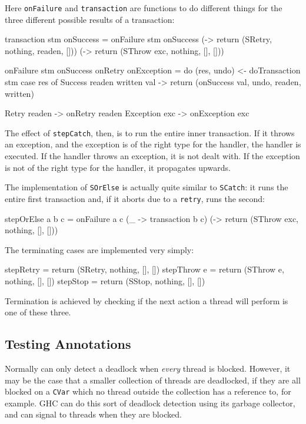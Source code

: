 Here \verb|onFailure| and \verb|transaction| are functions to do
different things for the three different possible results of a
transaction:

\begin{haskellcode}
transaction stm onSuccess = onFailure stm onSuccess
  (\readen -> return (SRetry, nothing, readen, []))
  (\exc    -> return (SThrow exc, nothing, [], []))

onFailure stm onSuccess onRetry onException = do
  (res, undo) <- doTransaction stm
  case res of
    Success readen written val -> return
      (onSuccess val, undo, readen, written)

    Retry readen  -> onRetry readen
    Exception exc -> onException exc
\end{haskellcode}

The effect of \verb|stepCatch|, then, is to run the entire inner
transaction. If it throws an exception, and the exception is of the
right type for the handler, the handler is executed. If the handler
throws an exception, it is not dealt with. If the exception is not of
the right type for the handler, it propagates upwards.

The implementation of \verb|SOrElse| is actually quite similar to
\verb|SCatch|: it runs the entire first transaction and, if it aborts
due to a \verb|retry|, runs the second:

\begin{haskellcode}
stepOrElse a b c = onFailure a c
  (\_   -> transaction b c)
  (\exc -> return (SThrow exc, nothing, [], []))
\end{haskellcode}

The terminating cases are implemented very simply:

\begin{haskellcode}
stepRetry   = return (SRetry,   nothing, [], [])
stepThrow e = return (SThrow e, nothing, [], [])
stepStop    = return (SStop,    nothing, [], [])
\end{haskellcode}

Termination is achieved by checking if the next action a thread will
perform is one of these three.

\subsection{Testing Annotations}
\label{sec:execution-stepwise-annotations}

Normally \dejafu{} can only detect a deadlock when \emph{every} thread
is blocked. However, it may be the case that a smaller collection of
threads are deadlocked, if they are all blocked on a \verb|CVar| which
no thread outside the collection has a reference to, for example. GHC
can do this sort of deadlock detection using its garbage collector,
and can signal to threads when they are blocked.

